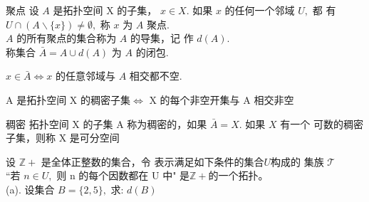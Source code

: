 \begin{definition}{聚点}
\noindent 设 $A$ 是拓扑空间 X 的子集， $x \in X .$ 如果 $x$ 的任何一个邻域 $U,$ 都
有 $U \cap(A \backslash\{x\}) \neq \emptyset,$ 称 $x$ 为 $A$ 聚点. \\$A$ 的所有聚点的集合称为 $A$ 的导集，记
作 $d(A) .$  \\称集合 $\bar{A}=A \cup d(A)$ 为 $A$ 的闭包.
\end{definition}
\begin{theorem}
\noindent $x \in \bar{A} \Longleftrightarrow x$ 的任意邻域与 $A$ 相交都不空.
\end{theorem}
\begin{theorem}
\noindent A 是拓扑空间 X 的稠密子集$\Longleftrightarrow$ X 的每个非空开集与 A 相交非空
\end{theorem}
\begin{definition}{稠密}
\noindent 拓扑空间 X 的子集 A 称为稠密的，如果 $\bar{A}=X .$ 如果 $X$ 有一个
可数的稠密子集，则称 X 是可分空间
\end{definition}
\begin{exercise}
设 $\mathbb{Z}+$ 是全体正整数的集合，令 表示满足如下条件的集合$U$构成的
集族 $\mathcal{T}$\\
“若 $n \in U,$ 则 $\mathrm{n}$ 的每个因数都在 $\mathrm{U}$ 中"
是$\mathbb{Z}+$的一个拓扑。\\
(a). 设集合 $B=\{2,5\},$ 求: $d(B)$

\end{exercise}
